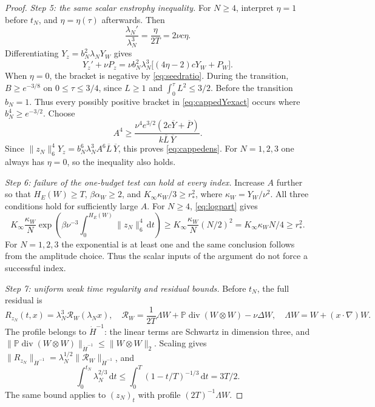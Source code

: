 \documentclass[11pt,a4paper]{article}
\theoremstyle{definition}\newtheorem{definition}[theorem]{Definition}
\theoremstyle{remark}\newtheorem{remark}[theorem]{Remark}
\newcommand{\PP}{\mathbb P}
\newcommand{\dd}{\,\mathrm d}
\newcommand{\norm}[1]{\lVert #1\rVert}
\newcommand{\diver}{\operatorname{div}}
\newcommand{\rstar}{r_*}
\newcommand{\Kinf}{K_\infty}
\numberwithin{equation}{section}
\begin{document}
\begin{proof}
\emph{Step 5: the same scalar enstrophy inequality.}
For $N\ge4$, interpret $\eta=1$ before $t_N$, and $\eta=\eta(\tau)$ afterwards. Then
\[
 \frac{\lambda_N'}{\lambda_N^3}=\frac{\eta}{2T}=2\nu c\eta.
\]
Differentiating $Y_z=b_N^2\lambda_NY_W$ gives
\begin{equation}\label{eq:cappedYexact}
 Y_z'+\nu P_z
 =\nu b_N^2\lambda_N^3\bigl[(4\eta-2)cY_W+P_W\bigr].
\end{equation}
When $\eta=0$, the bracket is negative by \eqref{eq:seedratio}. During the transition, $B\ge e^{-3/8}$ on $0\le\tau\le3/4$, since $L\ge1$ and $\int_0^\tau L^2\le3/2$. Before the transition $b_N=1$. Thus every possibly positive bracket in \eqref{eq:cappedYexact} occurs where $b_N^4\ge e^{-3/2}$. Choose
\begin{equation}\label{eq:Athreshold}
 A^4\ge\frac{\nu^4e^{3/2}(2c\overline Y+\overline P)}
                      {k\overline L\,\overline Y}.
\end{equation}
Since $\norm{z_N}_6^4Y_z=b_N^6\lambda_N^3 A^6\overline L\,\overline Y$, this proves \eqref{eq:cappedens}. For $N=1,2,3$ one always has $\eta=0$, so the inequality also holds.

\emph{Step 6: failure of the one-budget test can hold at every index.}
Increase $A$ further so that $H_E(W)\ge T$, $\beta\alpha_W\ge2$, and $\Kinf\kappa_W/3\ge\rstar^2$, where $\kappa_W=Y_W/\nu^2$. All three conditions hold for sufficiently large $A$. For $N\ge4$, \eqref{eq:logpart} gives
\[
 \Kinf\frac{\kappa_W}{N}
 \exp\!\left(\beta\nu^{-3}\int_0^{H_E(W)}\norm{z_N}_6^4\dd t\right)
 \ge\Kinf\frac{\kappa_W}{N}(N/2)^2
 =\Kinf\kappa_W N/4\ge\rstar^2.
\]
For $N=1,2,3$ the exponential is at least one and the same conclusion follows from the amplitude choice. Thus the scalar inputs of the argument do not force a successful index.

\emph{Step 7: uniform weak time regularity and residual bounds.}
Before $t_N$, the full residual is
\begin{equation}\label{eq:RW}
 R_{z_N}(t,x)=\lambda_N^3\mathcal R_W(\lambda_Nx),\quad
 \mathcal R_W=\frac1{2T}\Lambda W+\PP\diver(W\otimes W)-\nu\Delta W,
 \quad\Lambda W=W+(x\cdot\nabla)W.
\end{equation}
The profile belongs to $\dot H^{-1}$: the linear terms are Schwartz in dimension three, and
$\norm{\PP\diver(W\otimes W)}_{\dot H^{-1}}\le\norm{W\otimes W}_2$.
Scaling gives $\norm{R_{z_N}}_{\dot H^{-1}}=\lambda_N^{1/2}\norm{\mathcal R_W}_{\dot H^{-1}}$, and
\[
 \int_0^{t_N}\lambda_N^{2/3}\dd t\le\int_0^T(1-t/T)^{-1/3}\dd t=3T/2.
\]
The same bound applies to $(z_N)_t$ with profile $(2T)^{-1}\Lambda W$.


\end{proof}
\end{document}

